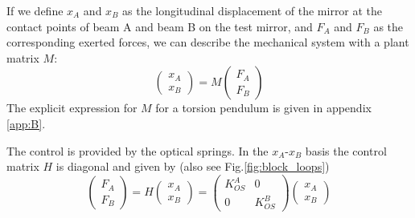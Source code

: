 \documentclass[%
 reprint,
 amsmath,amssymb,
 aps,
]{revtex4-1}
\begin{document}
If we define $x_A$ and $x_B$ as the longitudinal displacement of the mirror at the contact points
of beam A and beam B on the test mirror,
 and $F_A$ and $F_B$ as the corresponding exerted forces, we can describe the mechanical system with a plant matrix $M$:
\begin{equation}
 \begin{pmatrix}
x_A\\ x_B
\end{pmatrix} 
=
M \begin{pmatrix}
F_{A}\\ F_{B}
\end{pmatrix}
\label{eq:MF}
\end{equation}
The explicit expression for $M$ for a torsion pendulum is given in appendix \ref{app:B}.

The control is provided by the optical springs. In the $x_A$-$x_B$ basis the control matrix $H$ is diagonal and given by  (also see Fig.\ref{fig:block_loops})
\begin{equation}
\begin{pmatrix}
F_{A}\\ F_{B}
\end{pmatrix}
= H
 \begin{pmatrix}
x_A\\ x_B
\end{pmatrix} 
=  \begin{pmatrix}
K_{OS}^A & 0 \\ 0 & K_{OS}^B
\end{pmatrix} 
 \begin{pmatrix}
x_A\\ x_B
\end{pmatrix} 
\label{eq:HX}
\end{equation}
\end{document}
